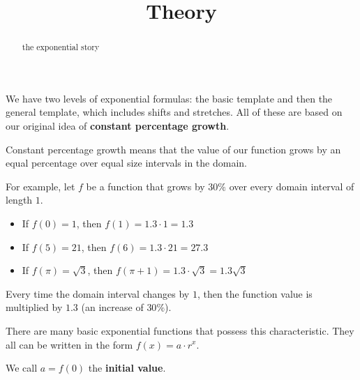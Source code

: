 \documentclass{ximera}
\title{Theory}
\begin{document}
\begin{abstract}
the exponential story
\end{abstract}
\maketitle





We have two levels of exponential formulas: the basic template and then the general template, which includes shifts and stretches.  All of these are based on our original idea of \textbf{\textcolor{purple!85!blue}{constant percentage growth}}.


Constant percentage growth means that the value  of our function grows by an equal percentage over equal size intervals in the domain.



For example, let $f$ be a function that grows by $30\%$ over every domain interval of length $1$. \\


\begin{itemize}
\item If $f(0) = 1$, then $f(1) = 1.3 \cdot 1 = 1.3$
\item If $f(5) = 21$, then $f(6) = 1.3 \cdot 21 = 27.3$
\item If $f(\pi) = \sqrt{3}$, then $f(\pi + 1) = 1.3 \cdot \sqrt{3} = 1.3 \sqrt{3}$
\end{itemize}

Every time the domain interval changes by $1$, then the function value is multiplied by $1.3$ (an increase of $30\%$).




There are many basic exponential functions that possess this characteristic. They all can be written in the form \textbf{\textcolor{blue!55!black}{$f(x) = a \cdot r^x$}}. 

We call \textbf{\textcolor{purple!85!blue}{$a=f(0)$}} the \textbf{\textcolor{purple!85!blue}{initial value}}.
\end{document}
